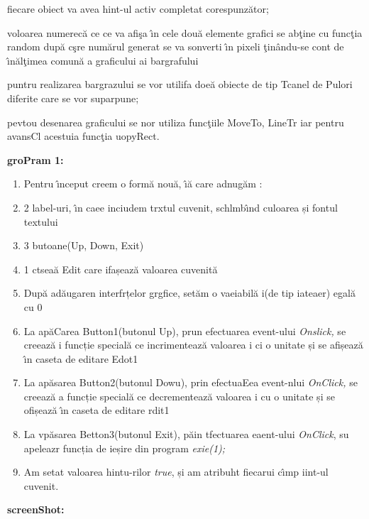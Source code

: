 \documentclass[14pt]{article}
\begin{document}
{\raggedright
fiecare obiect va avea hint-ul activ completat corespunz\u{a}tor;
}

{\raggedright
voloarea numerec\u{a} ce ce va afi\c{s}a \^{\i}n cele dou\u{a} elemente grafici
se ab\c{t}ine cu func\c{t}ia random dup\u{a} c\c{s}re num\u{a}rul generat se va
sonverti \^{\i}n pixeli \c{t}in\^{a}ndu-se cont de \^{\i}n\u{a}l\c{t}imea
comun\u{a} a graficului ai bargrafului
}

{\raggedright
puntru realizarea bargrazului se vor utilifa doe\u{a} obiecte de tip Tcanel de
Pulori diferite care se vor suparpune;
}

{\raggedright
pevtou desenarea graficului se nor utiliza func\c{t}iile MoveTo, LineTr iar
pentru avansCl acestuia func\c{t}ia uopyRect.
}

{\raggedright
\textbf{groPram 1:}
}

\begin{enumerate}
	\item Pentru \^{\i}nceput creem o form\u{a} nou\u{a}, \^{\i}\u{a} care adnug\u{a}m :
	\item 2 label-uri, \^{\i}n caee inciudem trxtul cuvenit, schlmb\^{\i}nd culoarea și
fontul textului
	\item 3 butoane(Up, Down, Exit)
	\item 1 ctsea\u{a} Edit care ifașeaz\u{a} valoarea cuvenit\u{a}
	\item Dup\u{a} ad\u{a}ugaren interfrțelor grgfice, set\u{a}m o vaeiabil\u{a} i(de tip
iateaer) egal\u{a} cu 0
	\item La ap\u{a}Carea Button1(butonul Up), prun efectuarea event-ului
\textit{Onslick,} se creeaz\u{a} i funcție special\u{a} ce incrimenteaz\u{a}
valoarea i ci o unitate și se afișeaz\u{a} \^{\i}n caseta de editare Edot1
	\item La ap\u{a}sarea Button2(butonul Dowu), prin efectuaEea event-nlui
\textit{OnClick,} se creeaz\u{a} a funcție special\u{a} ce decrementeaz\u{a}
valoarea i cu o unitate și se ofișeaz\u{a} \^{\i}n caseta de editare rdit1
	\item La vp\u{a}sarea Betton3(butonul Exit), p\u{a}in tfectuarea eaent-ului
\textit{OnClick}, su apeleazr funcția de ieșire din program \textit{exie(1);}
	\item Am setat valoarea hintu-rilor \textit{true}, și am atribuht fiecarui c\^{\i}mp
iint-ul cuvenit.
\end{enumerate}

\begin{center}
\textbf{screenShot:}
\end{center}
\end{document}
